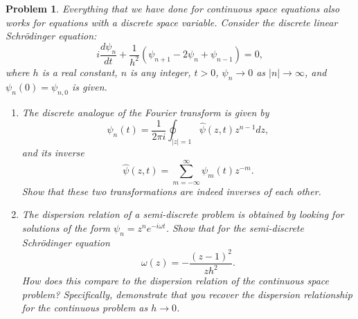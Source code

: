 \documentclass[12pt]{report}
\newtheorem{problem}{Problem}
\begin{document}


\begin{problem}
    Everything that we have done for continuous space equations also works
for equations with a discrete space variable. Consider the discrete linear
Schr\"odinger equation:
$$
i\frac{d\psi_n}{dt}+\frac{1}{h^2}(\psi_{n+1}-2 \psi_n+\psi_{n-1})=0,
$$
where $h$ is a real constant, $n$ is any integer, $t>0$, $\psi_n\rightarrow 0$
as $|n|\rightarrow \infty$, and $\psi_n(0)=\psi_{n,0}$ is given.
\begin{enumerate}
\item The discrete analogue of the Fourier transform is given by
$$
\psi_n(t)=\frac{1}{2\pi i}\oint_{|z|=1} \hat{\psi}(z,t) z^{n-1} dz,
$$
and its inverse
$$
\hat{\psi}(z,t)=\sum_{m=-\infty}^\infty \psi_m(t) z^{-m}.
$$
Show that these two transformations are indeed inverses of each other.
\item The dispersion relation of a semi-discrete problem is obtained by looking
for solutions of the form $\psi_n=z^n e^{-i \omega t}$. Show that for the
semi-discrete Schr\"odinger equation
$$
\omega(z)=-\frac{(z-1)^2}{zh^2}.
$$
How does this compare to the dispersion relation of the continuous space
problem? Specifically, demonstrate that you recover the dispersion relationship
for the continuous problem as $h\rightarrow 0$.
\end{enumerate}
\end{problem}
\end{document}
